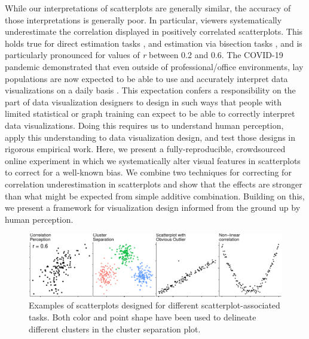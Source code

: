 \documentclass[manuscript, review, anonymous, screen]{acmart}
\begin{document}
While our interpretations of scatterplots are generally similar, the
accuracy of those interpretations is generally poor. In particular,
viewers systematically underestimate the correlation displayed in
positively correlated scatterplots. This holds true for direct
estimation tasks
\citep{strahan_1978, bobko_1979, cleveland_1982, lane_1985, lauer_1989, collyer_1990, meyer_1992},
and estimation via bisection tasks \citep{rensink_2017}, and is
particularly pronounced for values of \emph{r} between 0.2 and 0.6. The
COVID-19 pandemic demonstrated that even outside of professional/office
environments, lay populations are now expected to be able to use and
accurately interpret data visualizations on a daily basis
\citep{bbc_2022}. This expectation confers a responsibility on the part
of data visualization designers to design in such ways that people with
limited statistical or graph training can expect to be able to correctly
interpret data visualizations. Doing this requires us to understand
human perception, apply this understanding to data visualization design,
and test those designs in rigorous empirical work. Here, we present a
fully-reproducible, crowdsourced online experiment in which we
systematically alter visual features in scatterplots to correct for a
well-known bias. We combine two techniques for correcting for
correlation underestimation in scatterplots and show that the effects
are stronger than what might be expected from simple additive
combination. Building on this, we present a framework for visualization
design informed from the ground up by human perception.

\begin{figure}

{\centering \includegraphics[width=1\textwidth,height=\textheight]{size_and_opacity_files/figure-pdf/fig-tasks-1.pdf}

}

\caption{\label{fig-tasks}Examples of scatterplots designed for
different scatterplot-associated tasks. Both color and point shape have
been used to delineate different clusters in the cluster separation
plot.}

\end{figure}
\end{document}
